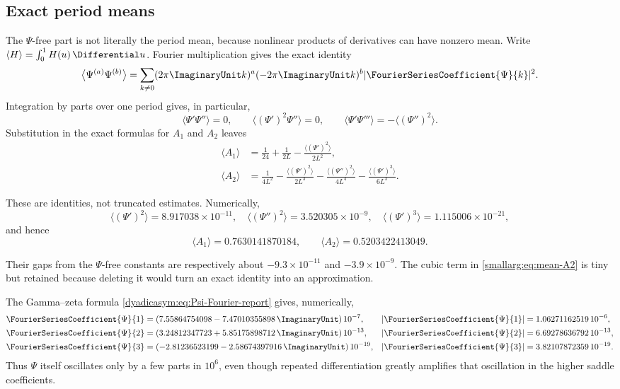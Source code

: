 \documentclass[11pt,oneside]{article}
\theoremstyle{definition}
\theoremstyle{remark}
\begin{document}
\subsection{Exact period means}

The \(\Psi\)-free part is not literally the period mean, because nonlinear products of
derivatives can have nonzero mean.  Write
\(\langle H\rangle=\int_0^1H(u)\,\Differential u\).  Fourier multiplication gives the exact identity
\begin{equation}
 \bigl\langle\Psi^{(a)}\Psi^{(b)}\bigr\rangle
 =\sum_{k\ne0}(2\pi\ImaginaryUnit k)^a(-2\pi\ImaginaryUnit k)^b
   |\FourierSeriesCoefficient{\Psi}{k}|^2.
 \label{smallarg:eq:derivative-product-mean}
\end{equation}
Integration by parts over one period gives, in particular,
\[
 \langle\Psi'\Psi''\rangle=0,\qquad
 \langle(\Psi')^2\Psi''\rangle=0,\qquad
 \langle\Psi'\Psi'''\rangle=-\langle(\Psi'')^2\rangle.
\]
Substitution in the exact formulas for \(A_1\) and \(A_2\) leaves
\begin{align}
 \langle A_1\rangle
 &=\frac1{24}+\frac1{2L}
   -\frac{\langle(\Psi')^2\rangle}{2L^2},
   \label{smallarg:eq:mean-A1}\\
 \langle A_2\rangle
 &=\frac1{4L^2}
   -\frac{\langle(\Psi')^2\rangle}{2L^3}
   -\frac{\langle(\Psi'')^2\rangle}{4L^4}
   -\frac{\langle(\Psi')^3\rangle}{6L^3}.
   \label{smallarg:eq:mean-A2}
\end{align}
\begin{samepage}
These are identities, not truncated estimates.  Numerically,
\[
 \langle(\Psi')^2\rangle=8.917038\times10^{-11},\quad
 \langle(\Psi'')^2\rangle=3.520305\times10^{-9},\quad
 \langle(\Psi')^3\rangle=1.115006\times10^{-21},
\]
and hence
\[
 \langle A_1\rangle=0.7630141870184,\qquad
 \langle A_2\rangle=0.5203422413049.
\]
\end{samepage}
Their gaps from the \(\Psi\)-free constants are respectively about
\(-9.3\times10^{-11}\) and \(-3.9\times10^{-9}\).  The cubic term in
\eqref{smallarg:eq:mean-A2} is tiny but retained because deleting it would turn an exact
identity into an approximation.

The Gamma--zeta formula \eqref{dyadicasym:eq:Psi-Fourier-report} gives, numerically,
\[
\begin{aligned}
  \FourierSeriesCoefficient{\Psi}{1}
    &=(7.55864754098-7.47010355898\,\ImaginaryUnit)\,10^{-7},
    &|\FourierSeriesCoefficient{\Psi}{1}|&=1.06271162519\,10^{-6},\\
  \FourierSeriesCoefficient{\Psi}{2}
    &=(3.24812347723+5.85175898712\,\ImaginaryUnit)\,10^{-13},
    &|\FourierSeriesCoefficient{\Psi}{2}|&=6.69278636792\,10^{-13},\\
  \FourierSeriesCoefficient{\Psi}{3}
    &=(-2.81236523199-2.58674397916\,\ImaginaryUnit)\,10^{-19},
    &|\FourierSeriesCoefficient{\Psi}{3}|&=3.82107872359\,10^{-19}.
\end{aligned}
\]
Thus \(\Psi\) itself oscillates only by a few parts in \(10^6\), even though repeated
differentiation greatly amplifies that oscillation in the higher saddle coefficients.
\end{document}
